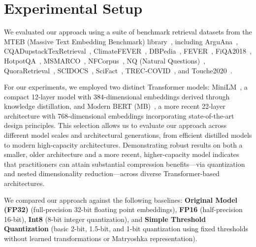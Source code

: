 \section{Experimental Setup}
\label{sec:experiments}

We evaluated our approach using a suite of benchmark retrieval datasets from the MTEB (Massive Text Embedding Benchmark) library~\cite{muennighoff2022mteb}, including ArguAna~\cite{wachsmuth-etal-2018-retrieval, thakur2021beir}, CQADupstackTexRetrieval~\cite{hoogeveen2015cqadupstack}, ClimateFEVER~\cite{diggelmann2020climatefever}, DBPedia~\cite{hasibi2017dbpedia}, FEVER~\cite{thorne2018fever}, FiQA2018~\cite{thakur2021beir}, HotpotQA~\cite{yang2018hotpotqa}, MSMARCO~\cite{nguyen2016ms}, NFCorpus~\cite{boteva2016full}, NQ (Natural Questions)~\cite{kwiatkowski2019natural}, QuoraRetrieval~\cite{iyer2017first, thakur2021beir}, SCIDOCS~\cite{specter2020cohan}, SciFact~\cite{wadden2020fact}, TREC-COVID~\cite{voorhees2021trec, thakur2021beir}, and Touche2020~\cite{bondarenko2020overview}.


For our experiments, we employed two distinct Transformer models: MiniLM~\cite{minilm, reimers-2019-sentence-bert}, a compact 12-layer model with 384-dimensional embeddings derived through knowledge distillation, and Modern BERT (MB)~\cite{modernbert, nussbaum2024nomic}, a more recent 22-layer architecture with 768-dimensional embeddings incorporating state-of-the-art design principles. This selection allows us to evaluate our approach across different model scales and architectural generations, from efficient distilled models to modern high-capacity architectures.
Demonstrating robust results on both a smaller, older architecture and a more recent, higher-capacity model indicates that practitioners can attain substantial compression benefits—via quantization and nested dimensionality reduction—across diverse Transformer-based architectures.


We compared our approach against the following baselines: \textbf{Original Model (FP32)} (full-precision 32-bit floating point embeddings), \textbf{FP16} (half-precision 16-bit), \textbf{Int8} (8-bit integer quantization), and \textbf{Simple Threshold Quantization} (basic 2-bit, 1.5-bit, and 1-bit quantization using fixed thresholds without learned transformations or Matryoshka representation).

